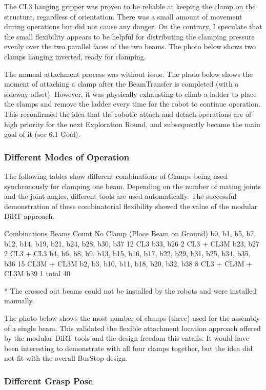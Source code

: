 The CL3 hanging gripper was proven to be reliable at keeping the clamp on the structure, regardless of orientation. There was a small amount of movement during operations but did not cause any danger. On the contrary, I speculate that the small flexibility appears to be helpful for distributing the clamping pressure evenly over the two parallel faces of the two beams.  The photo below shows two clamps hanging inverted, ready for clamping.

The manual attachment process was without issue. The photo below shows the moment of attaching a clamp after the BeamTransfer is completed (with a sideway offset). However, it was physically exhausting to climb a ladder to place the clamps and remove the ladder every time for the robot to continue operation. This reconfirmed the idea that the robotic attach and detach operations are of high priority for the next Exploration Round, and subsequently became the main goal of it (see 6.1 Goal).

\subsubsection{Different Modes of Operation}
\label{subsubsection:exploration_2_different_modes_of_operation}

The following tables show different combinations of Clamps being used synchronously for clamping one beam. Depending on the number of mating joints and the joint angles, different tools are used automatically. The successful demonstration of these combinatorial flexibility showed the value of the modular DiRT approach. 

Combinations
Beams
Count
No Clamp
(Place Beam on Ground)
b0, b1, b5, b7, b12, b14, b19, b21, b24, b28, b30, b37
12
CL3
b33, b26
2
CL3 + CL3M
b23, b27
2
CL3 + CL3
b4, b6, b8, b9, b13, b15, b16, b17, b22, b29, b31, b25, b34, b35, b36
15
CL3M + CL3M
b2, b3, b10, b11, b18, b20, b32, b38
8
CL3 + CL3M + CL3M
b39
1
total
40

* The crossed out beams could not be installed by the robots and were installed manually.

The photo below shows the most number of clamps (three) used for the assembly of a single beam. This validated the flexible attachment location approach offered by the modular DiRT tools and the design freedom this entails. It would have been interesting to demonstrate with all four clamps together, but the idea did not fit with the overall BusStop design.


\subsubsection{Different Grasp Pose}
\label{subsubsection:exploration_2_different_grasp_pose}

